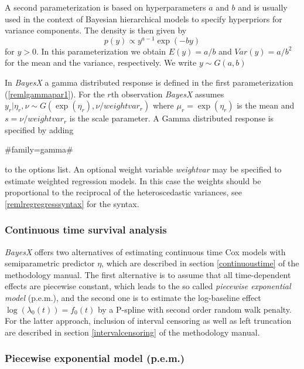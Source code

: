 A second parameterization is based on hyperparameters $a$ and $b$
and is usually used in the context of Bayesian hierarchical models
to specify hyperpriors for variance components. The density is
then given by
\begin{equation}
\label{remlgammapar2} p(y) \propto y^{a-1}\exp(-b y)
\end{equation}
for $y>0$. In this parameterization we obtain $E(y) = a/b$ and
$Var(y) = a/b^2$ for the mean and the variance, respectively. We
write $y \sim G(a,b)$

In {\em BayesX} a gamma distributed response is defined in the first
parameterization (\ref{remlgammapar1}). For the $r$th observation
{\em BayesX} assumes  $y_r | \eta_r,\nu \sim
G(\exp(\eta_r),\nu/weightvar_r)$ where $\mu_r = \exp(\eta_r)$ is the
mean and $s=\nu/weightvar_r$ is the scale parameter. A Gamma
distributed response is specified by adding

#family=gamma#

to the options list. An optional weight variable {\em weightvar}
may be specified to estimate weighted regression models. In this
case the weights should be proportional to the reciprocal of the
heteroscedastic variances, see \autoref{remlregregresssyntax} for
the syntax.

\subsubsection*{Continuous time survival analysis}

\textit{BayesX} offers two alternatives of estimating continuous
time Cox models with semiparametric predictor $\eta$, which are
described in section \ref*{continuoustime} of the methodology
manual. The first alternative is to assume that all time-dependent
effects are piecewise constant, which leads to the so called
\textit{piecewise exponential model} (p.e.m.), and the second one is
to estimate the log-baseline effect $\log(\lambda_0(t))=f_0(t)$ by a
P-spline with second order random walk penalty. For the latter
approach, inclusion of interval censoring as well as left truncation
are described in section \ref*{intervalcensoring} of the methodology
manual.

\subsubsection*{Piecewise exponential model (p.e.m.)}

